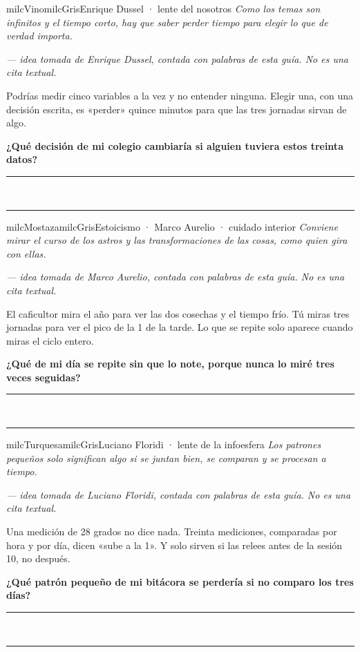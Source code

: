 \documentclass[11pt,letterpaper]{article}
\newcommand{\linead}[1]{\noindent\color{milcLinea}\rule{#1}{0.5pt}\color{milcNegro}}
\begin{document}
\begin{softbox}{milcVino}{milcGris}{Enrique Dussel · lente del nosotros}
\textit{Como los temas son infinitos y el tiempo corto, hay que saber perder tiempo para elegir lo que de verdad importa.}

{\footnotesize\itshape\color{milcNegro!70}--- idea tomada de Enrique Dussel, contada con palabras de esta guía. No es una cita textual.}

Podrías medir cinco variables a la vez y no entender ninguna. Elegir una, con una decisión escrita, es «perder» quince minutos para que las tres jornadas sirvan de algo.

\textbf{¿Qué decisión de mi colegio cambiaría si alguien tuviera estos treinta datos?}
\end{softbox}
\linead{\linewidth}\\[1mm]
\linead{\linewidth}

\begin{softbox}{milcMostaza}{milcGris}{Estoicismo · Marco Aurelio · cuidado interior}
\textit{Conviene mirar el curso de los astros y las transformaciones de las cosas, como quien gira con ellas.}

{\footnotesize\itshape\color{milcNegro!70}--- idea tomada de Marco Aurelio, contada con palabras de esta guía. No es una cita textual.}

El caficultor mira el año para ver las dos cosechas y el tiempo frío. Tú miras tres jornadas para ver el pico de la 1 de la tarde. Lo que se repite solo aparece cuando miras el ciclo entero.

\textbf{¿Qué de mi día se repite sin que lo note, porque nunca lo miré tres veces seguidas?}
\end{softbox}
\linead{\linewidth}\\[1mm]
\linead{\linewidth}

\begin{softbox}{milcTurquesa}{milcGris}{Luciano Floridi · lente de la infoesfera}
\textit{Los patrones pequeños solo significan algo si se juntan bien, se comparan y se procesan a tiempo.}

{\footnotesize\itshape\color{milcNegro!70}--- idea tomada de Luciano Floridi, contada con palabras de esta guía. No es una cita textual.}

Una medición de 28 grados no dice nada. Treinta mediciones, comparadas por hora y por día, dicen «sube a la 1». Y solo sirven si las relees antes de la sesión 10, no después.

\textbf{¿Qué patrón pequeño de mi bitácora se perdería si no comparo los tres días?}
\end{softbox}
\linead{\linewidth}\\[1mm]
\linead{\linewidth}
\end{document}
